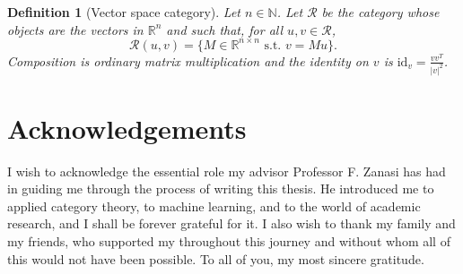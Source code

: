 \documentclass[11pt,a4paper,openright,twoside]{report}
\theoremstyle{plain}
\newtheorem{definition}[proposition]{Definition}
\theoremstyle{definition}
\begin{document}
\begin{definition}[Vector space category]
  \label{def: vecspacecat}
  Let $n \in \mathbb{N}$. Let $\mathcal{R}$ be the category whose objects are the vectors in $\mathbb{R}^n$ and such that, for all $u,v \in \mathcal{R}$, 
  \[\mathcal{R}(u, v) = \{M \in \mathbb{R}^{n \times n} \text{ s.t. } v = Mu\}.\]
  Composition is ordinary matrix multiplication and the identity on $v$ is $\mathrm{id}_v = \frac{vv^T}{|v|^2}$.
\end{definition}




\chapter*{Acknowledgements}

\thispagestyle{empty}

I wish to acknowledge the essential role my advisor Professor F. Zanasi has had in guiding me through the process of writing this thesis. He introduced me to applied category theory, to machine learning, and to the world of academic research, and I shall be forever grateful for it. I also wish to thank my family and my friends, who supported my throughout this journey and without whom all of this would not have been possible. To all of you, my most sincere gratitude.
\end{document}
